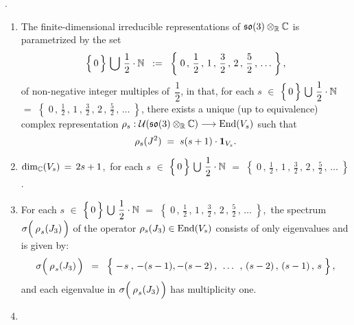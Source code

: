 
\vskip 0.5cm
\begin{theorem}
{\color{white}.}\vskip -0.1cm
\noindent
\begin{enumerate}
\item
	The finite-dimensional irreducible representations of $\mathfrak{so}(3) \otimes_{\mathbb{R}} \mathbb{C}$ is parametrized by the set
	\begin{equation*}
	\left\{\,\overset{{\color{white}.}}{0}\,\right\} \,\bigcup\, \dfrac{1}{2} \cdot \N
	\;\; := \;\;
		\left\{\;0 \,,\, \dfrac{1}{2} \,,\, 1 \,,\, \frac{3}{2} \,,\, 2 \,,\, \frac{5}{2} \,,\, \ldots \;\right\},
	\end{equation*}
	of non-negative integer multiples of \,$\dfrac{1}{2}$, in that, for each
	$s$
	$\in$ $\left\{\,\overset{{\color{white}.}}{0}\,\right\} \,\bigcup\, \dfrac{1}{2} \cdot \N$
	$=$ $\left\{\; 0 \,,\, \frac{1}{2}\,,\, 1\,,\, \frac{3}{2}\,,\, 2\,,\, \frac{5}{2}\,,\, \ldots \;\right\}$,
	there exists a unique (up to equivalence) complex representation
	$\rho_{s} : \mathcal{U}(\mathfrak{so}(3)\otimes_{\mathbb{R}}\mathbb{C}) \longrightarrow \textnormal{End}(V_{s})$
	such that
	\begin{equation*}
	\rho_{s}(J^{2}) \; = \; s(s+1)\cdot\textnormal{\textbf{1}}_{V_{s}}.
	\end{equation*}
\item
	$\dim_{\mathbb{C}}(V_{s}) \, = \, 2s + 1$,\, for each
	$s$
	$\in$ $\left\{\,\overset{{\color{white}.}}{0}\,\right\} \,\bigcup\, \dfrac{1}{2} \cdot \N$
	$=$ $\left\{\; 0 \,,\, \frac{1}{2}\,,\, 1\,,\, \frac{3}{2}\,,\, 2\,,\, \frac{5}{2}\,,\, \ldots \;\right\}$.
\item
	For each
	$s$
	$\in$ $\left\{\,\overset{{\color{white}.}}{0}\,\right\} \,\bigcup\, \dfrac{1}{2} \cdot \N$
	$=$ $\left\{\; 0 \,,\, \frac{1}{2}\,,\, 1\,,\, \frac{3}{2}\,,\, 2\,,\, \frac{5}{2}\,,\, \ldots \;\right\}$,\,
	the spectrum
	$\sigma\!\left(\,\overset{{\color{white}-}}{\rho}_{s}(J_{3})\,\right)$
	of the operator $\rho_{s}(J_{3}) \in \textnormal{End}(V_{s})$
	consists of only eigenvalues and is given by:
	\begin{equation*}
	\sigma\!\left(\,\overset{{\color{white}-}}{\rho}_{s}(J_{3})\,\right)
	\;\; = \;\;
		\left\{\;
			-\overset{{\color{white}-}}{s} \,,\, -(s-1), -(s-2)
			\,,\;\, \ldots \,\;,\,
			(s-2) \,,\, (s-1) \,,\, s
			\;\right\},
	\end{equation*}
	and each eigenvalue in 
	$\sigma\!\left(\,\overset{{\color{white}-}}{\rho}_{s}(J_{3})\,\right)$
	has multiplicity one.
\item

\end{enumerate}
\end{theorem}
